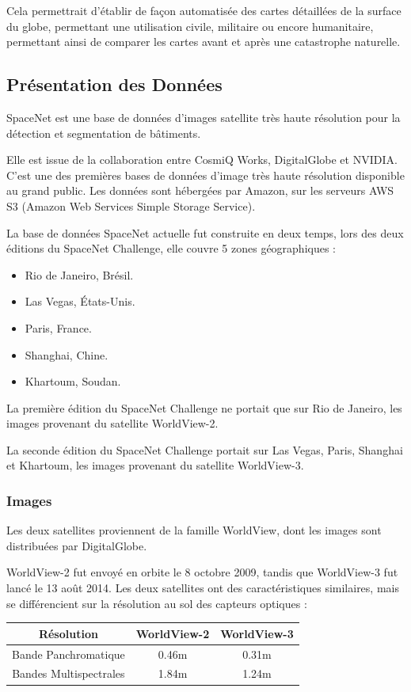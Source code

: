 \documentclass[a4paper, 11pt]{report}
\begin{document}
Cela permettrait d'établir de façon automatisée des cartes détaillées de la surface du globe, permettant une utilisation civile, militaire ou encore humanitaire, permettant ainsi de comparer les cartes avant et après une catastrophe naturelle.
\subsection{Présentation des Données}
SpaceNet est une base de données d'images satellite très haute résolution pour la détection et segmentation de bâtiments.

Elle est issue de la collaboration entre CosmiQ Works, DigitalGlobe et NVIDIA.
C'est une des premières bases de données d'image très haute résolution disponible au grand public.
Les données sont hébergées par Amazon, sur les serveurs AWS S3 (Amazon Web Services Simple Storage Service).

La base de données SpaceNet actuelle fut construite en deux temps, lors des deux éditions du SpaceNet Challenge, elle couvre 5 zones géographiques :
\begin{itemize}
	\item Rio de Janeiro, Brésil.
	\item Las Vegas, États-Unis.
	\item Paris, France.
	\item Shanghai, Chine.
	\item Khartoum, Soudan.
\end{itemize}

La première édition du SpaceNet Challenge ne portait que sur Rio de Janeiro, les images provenant du satellite WorldView-2.

La seconde édition du SpaceNet Challenge portait sur Las Vegas, Paris, Shanghai et Khartoum, les images provenant du satellite WorldView-3.

\subsubsection{Images}
Les deux satellites proviennent de la famille WorldView, dont les images sont distribuées par DigitalGlobe. 

WorldView-2 fut envoyé en orbite le 8 octobre 2009, tandis que WorldView-3 fut lancé le 13 août 2014.
Les deux satellites ont des caractéristiques similaires, mais se différencient sur la résolution au sol des capteurs optiques :
\begin{center}
	\begin{tabular}{|c|c|c|}
	\hline 
	Résolution & WorldView-2 & WorldView-3 \\ 
	\hline 
	Bande Panchromatique & 0.46m & 0.31m \\ 
	\hline 
	Bandes Multispectrales & 1.84m & 1.24m \\ 
	\hline
	\end{tabular}	
\end{center}
\end{document}
